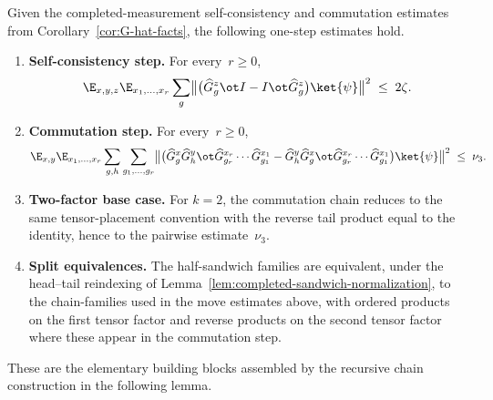 \begin{lemma}\label{lem:one-step-completed-sandwich-commutation}
	\leanok
	Given the completed-measurement self-consistency and commutation estimates
	from Corollary~\ref{cor:G-hat-facts}, the following one-step estimates hold.
	\begin{enumerate}
		\item \textbf{Self-consistency step.} For every~$r\ge 0$,
			\[
				\E_{x,y,z}\E_{x_1,\dots,x_r}
				\sum_{g}
				\bigl\|
				\bigl(\widehat G^{z}_g \ot I -
					I \ot \widehat G^{z}_g\bigr)
				\ket{\psi}
				\bigr\|^2
				\;\le\; 2\zeta.
			\]
		\item \textbf{Commutation step.} For every~$r\ge 0$,
			\[
				\E_{x,y}\E_{x_1,\dots,x_r}
				\sum_{g,h}\sum_{g_1,\dots,g_r}
				\bigl\|
				\bigl(
					\widehat G^{x}_g \widehat G^{y}_h
					\ot
					\widehat G^{x_r}_{g_r}\cdots
					\widehat G^{x_1}_{g_1}
					-
					\widehat G^{y}_h \widehat G^{x}_g
					\ot
					\widehat G^{x_r}_{g_r}\cdots
					\widehat G^{x_1}_{g_1}
				\bigr)
				\ket{\psi}
				\bigr\|^2
				\;\le\; \nu_3.
			\]
		\item \textbf{Two-factor base case.} For $k=2$, the commutation chain
			reduces to the same tensor-placement convention with the reverse
			tail product equal to the identity, hence to the pairwise
			estimate~$\nu_3$.
		\item \textbf{Split equivalences.} The half-sandwich families are
			equivalent, under the head--tail reindexing of
			Lemma~\ref{lem:completed-sandwich-normalization}, to the
			chain-families used in the move estimates above, with ordered
			products on the first tensor factor and reverse products on the
			second tensor factor where these appear in the commutation step.
	\end{enumerate}
	These are the elementary building blocks assembled by the recursive chain
	construction in the following lemma.
\end{lemma}
